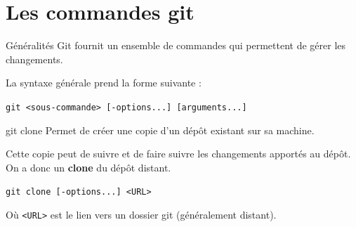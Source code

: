 \documentclass[svgnames,smaller]{beamer}
\renewcommand{\emph}[1]{\textbf{#1}}
\begin{document}

\section{Les commandes git}


\begin{frame}{Généralités}
Git fournit un ensemble de commandes qui permettent de gérer les changements.

La syntaxe générale prend la forme suivante :
\begin{center}
\large
\texttt{git <sous-commande> [-options...] [arguments...]}
\end{center}

\end{frame}


\begin{frame}{git clone}
Permet de créer une copie d'un dépôt existant sur sa machine.

Cette copie peut de suivre et de faire suivre les changements apportés au dépôt. On a donc un \emph{clone} du dépôt distant.

\begin{center}
\large
\texttt{git clone [-options...] <URL>}
\end{center}

Où \texttt{<URL>} est le lien vers un dossier git (généralement distant).

\end{frame}
\end{document}
